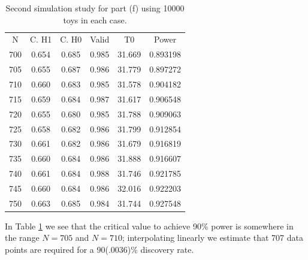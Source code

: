\documentclass[12pt]{article}
\begin{document}
\begin{table}
    \centering
    \begin{tabular}{| c | c | c | c | c | c |}
          N & C. H1   & C. H0    & Valid   & T0       & Power    \\
        700 & 0.654   & 0.685    & 0.985   & 31.669   & 0.893198 \\
        705 & 0.655   & 0.687    & 0.986   & 31.779   & 0.897272 \\
        710 & 0.660   & 0.683    & 0.985   & 31.578   & 0.904182 \\
        715 & 0.659   & 0.684    & 0.987   & 31.617   & 0.906548 \\
        720 & 0.655   & 0.680    & 0.985   & 31.788   & 0.909063 \\
        725 & 0.658   & 0.682    & 0.986   & 31.799   & 0.912854 \\
        730 & 0.661   & 0.682    & 0.986   & 31.679   & 0.916819 \\
        735 & 0.660   & 0.684    & 0.986   & 31.888   & 0.916607 \\
        740 & 0.661   & 0.684    & 0.988   & 31.746   & 0.921785 \\
        745 & 0.660   & 0.684    & 0.986   & 32.016   & 0.922203 \\
        750 & 0.663   & 0.685    & 0.984   & 31.744   & 0.927548 \\
    \end{tabular}
\caption{Second simulation study for part (f) using 10000 toys in each case.}
\label{tab_f_2}
\end{table}

In Table \ref{tab_f_2} we see that the critical value to achieve 90\% power is somewhere in the range $N=705$ and $N=710$; interpolating linearly we estimate that 707 data points are required for a 90(.0036)\% discovery rate.


\end{document}
